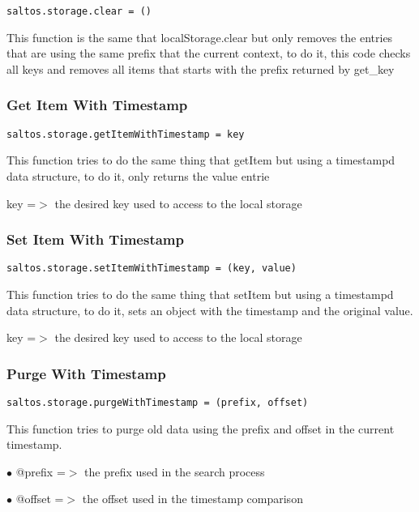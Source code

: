 \documentclass[a4paper]{article}
\begin{document}
\begin{lstlisting}
saltos.storage.clear = ()
\end{lstlisting}

This function is the same that localStorage.clear but only removes the entries that
are using the same prefix that the current context, to do it, this code checks all
keys and removes all items that starts with the prefix returned by get\_key

\hypertarget{toc852}{}
\subsubsection{Get Item With Timestamp}

\begin{lstlisting}
saltos.storage.getItemWithTimestamp = key
\end{lstlisting}

This function tries to do the same thing that getItem but using a timestampd data
structure, to do it, only returns the value entrie

key =$>$ the desired key used to access to the local storage

\hypertarget{toc853}{}
\subsubsection{Set Item With Timestamp}

\begin{lstlisting}
saltos.storage.setItemWithTimestamp = (key, value)
\end{lstlisting}

This function tries to do the same thing that setItem but using a timestampd data
structure, to do it, sets an object with the timestamp and the original value.

key =$>$ the desired key used to access to the local storage

\hypertarget{toc854}{}
\subsubsection{Purge With Timestamp}

\begin{lstlisting}
saltos.storage.purgeWithTimestamp = (prefix, offset)
\end{lstlisting}

This function tries to purge old data using the prefix and offset in the current
timestamp.

\begin{compactitem}
\item[\color{myblue}$\bullet$] @prefix =$>$ the prefix used in the search process
\item[\color{myblue}$\bullet$] @offset =$>$ the offset used in the timestamp comparison
\end{compactitem}
\end{document}
